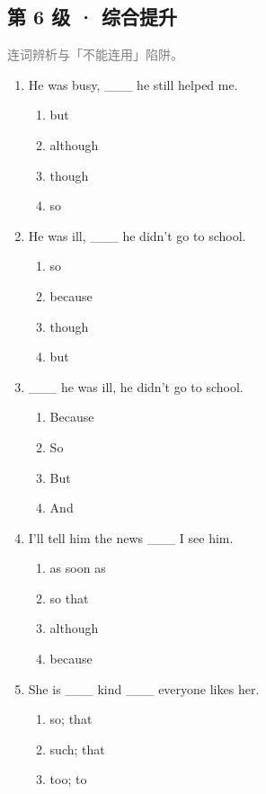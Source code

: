 \documentclass[11pt,a4paper]{ctexart}
\begin{document}
\subsection*{第 6 级 · 综合提升}
\noindent\textcolor{gray}{连词辨析与「不能连用」陷阱。}\par\smallskip
\begin{enumerate}[leftmargin=*,itemsep=4pt]
\item He was busy, \_\_\_ he still helped me.
\begin{enumerate}[label=\Alph*.,leftmargin=2em,itemsep=1pt,topsep=2pt]
\item but
\item although
\item though
\item so
\end{enumerate}
\item He was ill, \_\_\_ he didn’t go to school.
\begin{enumerate}[label=\Alph*.,leftmargin=2em,itemsep=1pt,topsep=2pt]
\item so
\item because
\item though
\item but
\end{enumerate}
\item \_\_\_ he was ill, he didn’t go to school.
\begin{enumerate}[label=\Alph*.,leftmargin=2em,itemsep=1pt,topsep=2pt]
\item Because
\item So
\item But
\item And
\end{enumerate}
\item I’ll tell him the news \_\_\_ I see him.
\begin{enumerate}[label=\Alph*.,leftmargin=2em,itemsep=1pt,topsep=2pt]
\item as soon as
\item so that
\item although
\item because
\end{enumerate}
\item She is \_\_\_ kind \_\_\_ everyone likes her.
\begin{enumerate}[label=\Alph*.,leftmargin=2em,itemsep=1pt,topsep=2pt]
\item so; that
\item such; that
\item too; to

\end{enumerate}
\end{enumerate}
\end{document}

